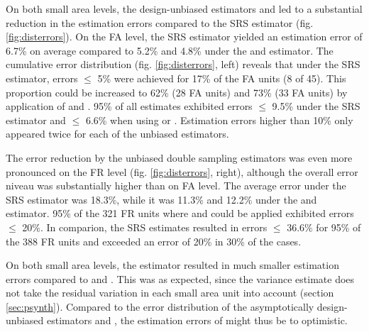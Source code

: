 On both small area levels, the design-unbiased estimators \psmall{} and \extpsynth{} led to a substantial reduction in the estimation errors compared to the SRS estimator (fig. \ref{fig:disterrors}). On the FA level, the SRS estimator yielded an estimation error of 6.7\% on average compared to 5.2\% and 4.8\% under the \extpsynth{} and \psmall{} estimator. The cumulative error distribution (fig. \ref{fig:disterrors}, left) reveals that under the SRS estimator, errors $\leq$ 5\% were achieved for 17\% of the FA units (8 of 45). This proportion could be increased to 62\% (28 FA units) and 73\% (33 FA units) by application of \psmall{} and \extpsynth{}. 95\% of all estimates exhibited errors $\leq$ 9.5\% under the SRS estimator and $\leq$ 6.6\% when using \psmall{} or \extpsynth{}. Estimation errors higher than 10\% only appeared twice for each of the unbiased estimators.\par

The error reduction by the unbiased double sampling estimators was even more pronounced on the FR level (fig. \ref{fig:disterrors}, right), although the overall error niveau was substantially higher than on FA level. The average error under the SRS estimator was 18.3\%, while it was 11.3\% and 12.2\% under the \psmall{} and \extpsynth{} estimator. 95\% of the 321 FR units where \psmall{} and \extpsynth{} could be applied exhibited errors $\leq$ 20\%. In comparion, the SRS estimates resulted in errors $\leq$ 36.6\% for 95\% of the 388 FR units and exceeded an error of 20\% in 30\% of the cases.\par

On both small area levels, the \psynth{} estimator resulted in much smaller estimation errors compared to \psmall{} and \extpsynth{}. This was as expected, since the \psynth{} variance estimate does not take the residual variation in each small area unit into account (section \ref{sec:psynth}). Compared to the error distribution of the asymptotically design-unbiased estimators \psmall{} and \extpsynth{}, the estimation errors of \psynth{} might thus be to optimistic.

